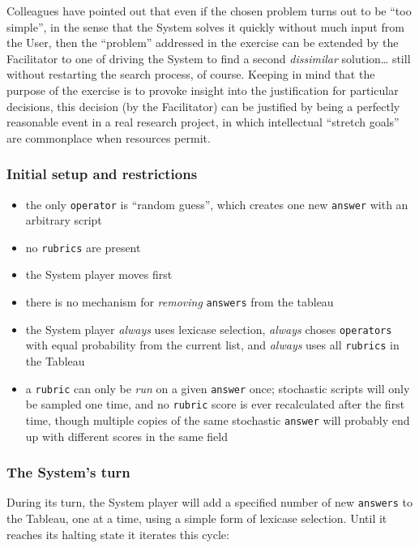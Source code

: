 Colleagues have pointed out that even if the chosen problem turns out to be ``too simple'', in the sense that the System solves it quickly without much input from the User, then the ``problem'' addressed in the exercise can be extended by the Facilitator to one of driving the System to find a second \emph{dissimilar} solution\ldots{} still without restarting the search process, of course. Keeping in mind that the purpose of the exercise is to provoke insight into the justification for particular decisions, this decision (by the Facilitator) can be justified by being a perfectly reasonable event in a real research project, in which intellectual ``stretch goals'' are commonplace when resources permit.

\subsubsection{Initial setup and restrictions}\hypertarget{initial-setup-and-restrictions}{}\label{initial-setup-and-restrictions}

\begin{itemize}
\item the only {\tt operator} is ``random guess'', which creates one new {\tt answer} with an arbitrary script
\item no {\tt rubrics} are present
\item the System player moves first
\item there is no mechanism for \emph{removing} {\tt answers} from the tableau
\item the System player \emph{always} uses lexicase selection, \emph{always} choses {\tt operators} with equal probability from the current list, and \emph{always} uses all {\tt rubrics} in the Tableau
\item a {\tt rubric} can only be \emph{run} on a given {\tt answer} once; stochastic scripts will only be sampled one time, and no {\tt rubric} score is ever recalculated after the first time, though multiple copies of the same stochastic {\tt answer} will probably end up with different scores in the same field
\end{itemize}

\subsubsection{The System's turn}\hypertarget{the-systems-turn}{}\label{the-systems-turn}

During its turn, the System player will add a specified number of new {\tt answers} to the Tableau, one at a time, using a simple form of lexicase selection. Until it reaches its halting state it iterates this cycle:

